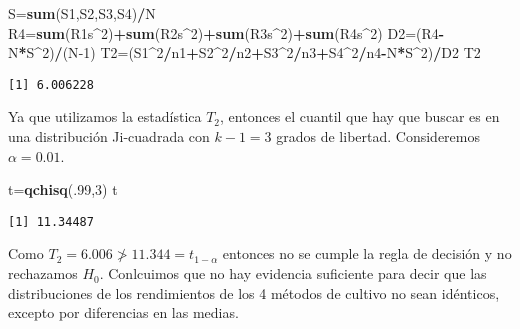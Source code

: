 \documentclass[
  a4paper,
  oneside,
  openany]{book}
\newenvironment{Shaded}{\begin{snugshade}}{\end{snugshade}}
\newcommand{\DecValTok}[1]{\textcolor[rgb]{0.00,0.00,0.81}{#1}}
\newcommand{\FunctionTok}[1]{\textcolor[rgb]{0.13,0.29,0.53}{\textbf{#1}}}
\newcommand{\NormalTok}[1]{#1}
\newcommand{\OtherTok}[1]{\textcolor[rgb]{0.56,0.35,0.01}{#1}}
\newcommand{\SpecialCharTok}[1]{\textcolor[rgb]{0.81,0.36,0.00}{\textbf{#1}}}
\begin{document}
\begin{Shaded}
\begin{Highlighting}[]
\NormalTok{S}\OtherTok{=}\FunctionTok{sum}\NormalTok{(S1,S2,S3,S4)}\SpecialCharTok{/}\NormalTok{N}
\NormalTok{R4}\OtherTok{=}\FunctionTok{sum}\NormalTok{(R1s}\SpecialCharTok{\^{}}\DecValTok{2}\NormalTok{)}\SpecialCharTok{+}\FunctionTok{sum}\NormalTok{(R2s}\SpecialCharTok{\^{}}\DecValTok{2}\NormalTok{)}\SpecialCharTok{+}\FunctionTok{sum}\NormalTok{(R3s}\SpecialCharTok{\^{}}\DecValTok{2}\NormalTok{)}\SpecialCharTok{+}\FunctionTok{sum}\NormalTok{(R4s}\SpecialCharTok{\^{}}\DecValTok{2}\NormalTok{)}
\NormalTok{D2}\OtherTok{=}\NormalTok{(R4}\SpecialCharTok{{-}}\NormalTok{N}\SpecialCharTok{*}\NormalTok{S}\SpecialCharTok{\^{}}\DecValTok{2}\NormalTok{)}\SpecialCharTok{/}\NormalTok{(N}\DecValTok{{-}1}\NormalTok{)}
\NormalTok{T2}\OtherTok{=}\NormalTok{(S1}\SpecialCharTok{\^{}}\DecValTok{2}\SpecialCharTok{/}\NormalTok{n1}\SpecialCharTok{+}\NormalTok{S2}\SpecialCharTok{\^{}}\DecValTok{2}\SpecialCharTok{/}\NormalTok{n2}\SpecialCharTok{+}\NormalTok{S3}\SpecialCharTok{\^{}}\DecValTok{2}\SpecialCharTok{/}\NormalTok{n3}\SpecialCharTok{+}\NormalTok{S4}\SpecialCharTok{\^{}}\DecValTok{2}\SpecialCharTok{/}\NormalTok{n4}\SpecialCharTok{{-}}\NormalTok{N}\SpecialCharTok{*}\NormalTok{S}\SpecialCharTok{\^{}}\DecValTok{2}\NormalTok{)}\SpecialCharTok{/}\NormalTok{D2}
\NormalTok{T2}
\end{Highlighting}
\end{Shaded}

\begin{verbatim}
[1] 6.006228
\end{verbatim}

Ya que utilizamos la estadística \(T_2\), entonces el cuantil que hay que buscar es en una distribución Ji-cuadrada con \(k-1=3\) grados de libertad. Consideremos \(\alpha=0.01\).

\begin{Shaded}
\begin{Highlighting}[]
\NormalTok{t}\OtherTok{=}\FunctionTok{qchisq}\NormalTok{(.}\DecValTok{99}\NormalTok{,}\DecValTok{3}\NormalTok{)}
\NormalTok{t}
\end{Highlighting}
\end{Shaded}

\begin{verbatim}
[1] 11.34487
\end{verbatim}

Como \(T_2=6.006\ngtr11.344=t_{1-\alpha}\) entonces no se cumple la regla de decisión y no rechazamos \(H_0\). Conlcuimos que no hay evidencia suficiente para decir que las distribuciones de los rendimientos de los 4 métodos de cultivo no sean idénticos, excepto por diferencias en las medias.
\end{document}
